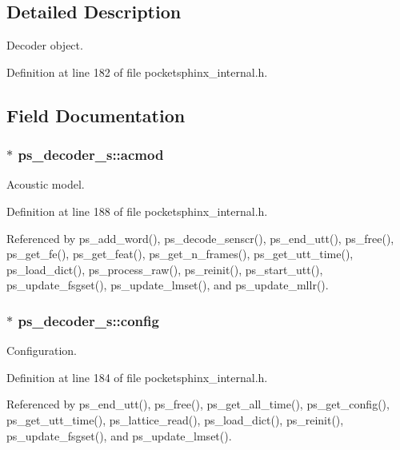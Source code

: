 \subsection{Detailed Description}
Decoder object. 

Definition at line 182 of file pocketsphinx\-\_\-internal.\-h.



\subsection{Field Documentation}
\subsubsection[{acmod}]{$\ast$ ps\-\_\-decoder\-\_\-s\-::acmod}\label{structps__decoder__s_af834d2bc1d44c1d9ef607b025413a0b8}


Acoustic model. 



Definition at line 188 of file pocketsphinx\-\_\-internal.\-h.



Referenced by ps\-\_\-add\-\_\-word(), ps\-\_\-decode\-\_\-senscr(), ps\-\_\-end\-\_\-utt(), ps\-\_\-free(), ps\-\_\-get\-\_\-fe(), ps\-\_\-get\-\_\-feat(), ps\-\_\-get\-\_\-n\-\_\-frames(), ps\-\_\-get\-\_\-utt\-\_\-time(), ps\-\_\-load\-\_\-dict(), ps\-\_\-process\-\_\-raw(), ps\-\_\-reinit(), ps\-\_\-start\-\_\-utt(), ps\-\_\-update\-\_\-fsgset(), ps\-\_\-update\-\_\-lmset(), and ps\-\_\-update\-\_\-mllr().

\subsubsection[{config}]{$\ast$ ps\-\_\-decoder\-\_\-s\-::config}\label{structps__decoder__s_a0565ed97b32408bd05c8104f020cef05}


Configuration. 



Definition at line 184 of file pocketsphinx\-\_\-internal.\-h.



Referenced by ps\-\_\-end\-\_\-utt(), ps\-\_\-free(), ps\-\_\-get\-\_\-all\-\_\-time(), ps\-\_\-get\-\_\-config(), ps\-\_\-get\-\_\-utt\-\_\-time(), ps\-\_\-lattice\-\_\-read(), ps\-\_\-load\-\_\-dict(), ps\-\_\-reinit(), ps\-\_\-update\-\_\-fsgset(), and ps\-\_\-update\-\_\-lmset().

